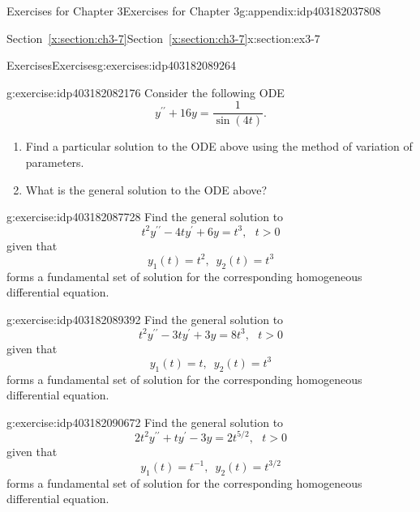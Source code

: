 \documentclass[oneside,10pt,]{book}
\newcommand{\xreffont}{\relax}
\numberwithin{equation}{section}
\numberwithin{equation}{section}
\begin{document}
\begin{appendixptx}{Exercises for Chapter 3}{}{Exercises for Chapter 3}{}{}{g:appendix:idp403182037808}
\begin{sectionptx}{Section~{\xreffont\ref*{x:section:ch3-7}}}{}{Section~{\xreffont\ref*{x:section:ch3-7}}}{}{}{x:section:ex3-7}
%
\begin{exercises-subsection-numberless}{Exercises}{}{Exercises}{}{}{g:exercises:idp403182089264}
\begin{divisionexercise}{1}{}{}{g:exercise:idp403182082176}%
Consider the following ODE%
\begin{equation*}
y^{\prime\prime}+16y=\frac{1}{\sin\left(4t\right)}.
\end{equation*}
%
\begin{enumerate}[label=(\alph*)]
\item{}Find a particular solution to the ODE above using the method of variation of parameters.%
\item{}What is the general solution to the ODE above?%
\end{enumerate}
%
\end{divisionexercise}%
\begin{divisionexercise}{2}{}{}{g:exercise:idp403182087728}%
Find the general solution to%
\begin{equation*}
t^{2}y^{\prime\prime}-4ty^{\prime}+6y=t^{3},\,\,\,\,t>0
\end{equation*}
given that%
\begin{equation*}
y_{1}(t)=t^{2},\,\,\,y_{2}(t)=t^{3}
\end{equation*}
forms a fundamental set of solution for the corresponding homogeneous differential equation.%
\end{divisionexercise}%
\begin{divisionexercise}{3}{}{}{g:exercise:idp403182089392}%
Find the general solution to%
\begin{equation*}
t^{2}y^{\prime\prime}-3ty^{\prime}+3y=8t^{3},\,\,\,\,t>0
\end{equation*}
given that%
\begin{equation*}
y_{1}(t)=t,\,\,\,y_{2}(t)=t^{3}
\end{equation*}
forms a fundamental set of solution for the corresponding homogeneous differential equation.%
\end{divisionexercise}%
\begin{divisionexercise}{4}{}{}{g:exercise:idp403182090672}%
Find the general solution to%
\begin{equation*}
2t^{2}y^{\prime\prime}+ty^{\prime}-3y=2t^{5/2},\,\,\,\,t>0
\end{equation*}
given that%
\begin{equation*}
y_{1}(t)=t^{-1},\,\,\,y_{2}(t)=t^{3/2}
\end{equation*}
forms a fundamental set of solution for the corresponding homogeneous differential equation.%

\end{divisionexercise}
\end{exercises-subsection-numberless}
\end{sectionptx}
\end{appendixptx}
\end{document}
